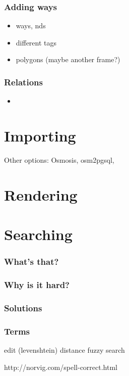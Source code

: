 \documentclass{beamer}
\begin{document}
\begin{frame}
  \frametitle{Adding ways}
  \begin{itemize}
  \item ways, nds
  \item different tags
  \item polygons (maybe another frame?)
  \end{itemize}
\end{frame}


\begin{frame}
  \frametitle{Relations}
  \begin{itemize}
  \item
  \end{itemize}
\end{frame}

\section{Importing}

Other options: Osmosis, osm2pgsql,

\section{Rendering}

\section{Searching}

\begin{frame}
  \frametitle{What's that?}

\end{frame}

\begin{frame}
  \frametitle{Why is it hard?}

\end{frame}

\begin{frame}
  \frametitle{Solutions}

\end{frame}

\begin{frame}
  \frametitle{Terms}
  edit (levenshtein) distance
  fuzzy search
\end{frame}

http://norvig.com/spell-correct.html




\end{document}
